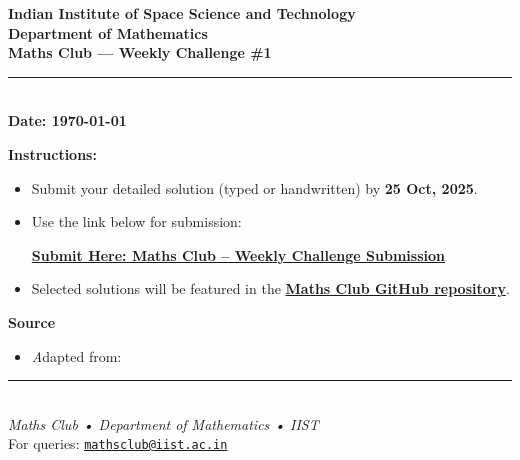 \documentclass[12pt,a4paper]{article}
\newcommand{\challengenumber}{1}                %
\newcommand{\datefield}{\today}           %
\newcommand{\submissiondatefield}{25 Oct, 2025}           %
\newcommand{\submissionlink}{https://forms.gle/GLMsxBVwLkV5kedp7} %
\newcommand{\repolink}{https://github.com/mathsclub-iist/maths-club-weekly-challenges}
\newcommand{\difficulty}[1]{%
	\textbf{Difficulty: }%
	\foreach \i in {1,...,5}{%
		\ifnum\i>#1
		\textcolor{gray!60}{\ding{72}}%
		\else
		\textcolor{orange}{\ding{72}}%
		\fi
	}%
}
\begin{document}
	
	\begin{center}
		\vspace*{0.2cm}
		{\large \textbf{Indian Institute of Space Science and Technology}}\\[2pt]
		{\normalsize \textbf{Department of Mathematics}}\\[8pt]
		{\LARGE \textbf{Maths Club — Weekly Challenge \#\challengenumber}}\\[6pt]
		\rule{0.9\textwidth}{0.4pt}\\[6pt]
		\textbf{Date: \datefield}
	\end{center}
	
	\vspace{0.8em}
	
	\begin{tcolorbox}[
		colback=gray!5,
		colframe=blue!70!black,
		title={\textbf{Challenge Question}\hfill\textbf{\difficulty{4}}},
		fonttitle=\large\bfseries,
		boxrule=0.8pt,
		arc=3pt,
		left=6pt,
		right=6pt,
		top=6pt,
		bottom=6pt
		]
	\end{tcolorbox}
	
	\vspace{1em}
	\noindent\textbf{Instructions:}
	\begin{itemize}[left=1em]
		\item Submit your detailed solution (typed or handwritten) by \textbf{\submissiondatefield}.
		\item Use the link below for submission:
		\begin{center}
			\href{\submissionlink}{\textbf{Submit Here: Maths Club – Weekly Challenge Submission}}
		\end{center}
		\item Selected solutions will be featured in the \href{\repolink}{\textbf{Maths Club GitHub repository}}.
	\end{itemize}
	
	\vspace{1.5em}
	
	\noindent\textbf{Source}
	\begin{itemize}[left=1em]
		\item \textit Adapted from: %
	\end{itemize}
	
	
	
	\begin{center}
		\rule{0.9\textwidth}{0.4pt}\\[4pt]
		\textit{Maths Club • Department of Mathematics • IIST}\\
		\vspace{0.3cm}
		\small For queries: \href{mailto:mathsclub@iist.ac.in}{\texttt{mathsclub@iist.ac.in}}
	\end{center}
	
\end{document}
